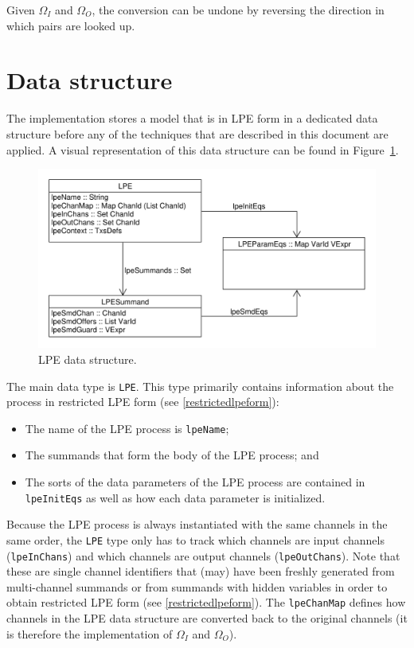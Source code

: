 Given $\Omega_I$ and $\Omega_O$, the conversion can be undone by reversing the direction in which pairs are looked up.

\section{Data structure}

The implementation stores a \txs{} model that is in LPE form in a dedicated data structure before any of the techniques that are described in this document are applied.
A visual representation of this data structure can be found in Figure~\ref{lpedatastructure:fig}.

\begin{figure}[!ht]
\begin{center}
\includegraphics[width=0.7\linewidth]{images/lpe-types}
\caption{LPE data structure.}
\label{lpedatastructure:fig}
\end{center}
\end{figure}

The main data type is \texttt{LPE}.
This type primarily contains information about the \txs{} process in restricted LPE form (see \ref{restrictedlpeform}):
\begin{itemize}
\item The name of the LPE process is \texttt{lpeName};
\item The summands that form the body of the LPE process; and
\item The sorts of the data parameters of the LPE process are contained in \texttt{lpeInitEqs} as well as how each data parameter is initialized.
\end{itemize}

Because the LPE process is always instantiated with the same channels in the same order, the \texttt{LPE} type only has to track which channels are input channels (\texttt{lpeInChans}) and which channels are output channels (\texttt{lpeOutChans}).
Note that these are single channel identifiers that (may) have been freshly generated from multi-channel summands or from summands with hidden variables in order to obtain restricted LPE form (see \ref{restrictedlpeform}).
The \texttt{lpeChanMap} defines how channels in the LPE data structure are converted back to the original channels (it is therefore the implementation of $\Omega_I$ and $\Omega_O$).

